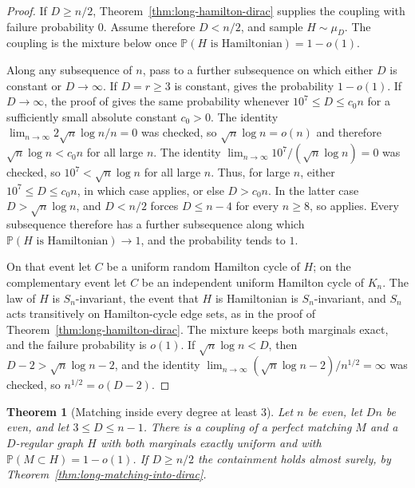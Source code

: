 \documentclass[11pt]{article}
\newtheorem{theorem}{Theorem}
\newcommand{\PP}{\mathbb{P}}
\begin{document}
\begin{proof}
If \(D\ge n/2\), Theorem~\ref{thm:long-hamilton-dirac} supplies the coupling with
failure probability \(0\). Assume therefore \(D<n/2\), and sample \(H\sim\mu_D\).
The coupling is the mixture below once \(\PP(H\text{ is Hamiltonian})=1-o(1)\).

Along any subsequence of \(n\), pass to a further subsequence on which either \(D\)
is constant or \(D\to\infty\).
If \(D=r\ge 3\) is constant, \cite[Theorem~1]{RW94} gives the probability \(1-o(1)\).
If \(D\to\infty\), the proof of \cite[Theorem~1(b)]{CFR02} gives the same
probability whenever \(10^{7}\le D\le c_0 n\) for a sufficiently small absolute
constant \(c_0>0\).
The identity \(\lim_{n\to\infty}2\sqrt{n}\log n/n=0\) was checked, so
\(\sqrt{n}\log n=o(n)\) and therefore \(\sqrt{n}\log n<c_0 n\) for all large \(n\).
The identity \(\lim_{n\to\infty}10^{7}/(\sqrt{n}\log n)=0\) was checked, so
\(10^{7}<\sqrt{n}\log n\) for all large \(n\).
Thus, for large \(n\), either \(10^{7}\le D\le c_0 n\), in which case
\cite[Theorem~1(b)]{CFR02} applies, or else \(D>c_0 n\).
In the latter case \(D>\sqrt{n}\log n\), and \(D<n/2\) forces \(D\le n-4\) for every
\(n\ge 8\), so \cite[Theorem~2.4]{KSVW01} applies.
Every subsequence therefore has a further subsequence along which
\(\PP(H\text{ is Hamiltonian})\to 1\), and the probability tends to \(1\).

On that event let \(C\) be a uniform random Hamilton cycle of \(H\); on the
complementary event let \(C\) be an independent uniform Hamilton cycle of \(K_n\).
The law of \(H\) is \(S_n\)-invariant, the event that \(H\) is Hamiltonian is
\(S_n\)-invariant, and \(S_n\) acts transitively on Hamilton-cycle edge sets, as in
the proof of Theorem~\ref{thm:long-hamilton-dirac}.
The mixture keeps both marginals exact, and the failure probability is \(o(1)\).
If \(\sqrt{n}\log n<D\), then \(D-2>\sqrt{n}\log n-2\), and the identity
\(\lim_{n\to\infty}(\sqrt{n}\log n-2)/n^{1/2}=\infty\) was checked, so
\(n^{1/2}=o(D-2)\).
\end{proof}

\begin{theorem}[Matching inside every degree at least \(3\)]
\label{thm:long-matching-at-least-three}
Let \(n\) be even, let \(Dn\) be even, and let \(3\le D\le n-1\). There is a
coupling of a perfect matching \(M\) and a \(D\)-regular graph \(H\) with both
marginals exactly uniform and with \(\PP(M\subset H)=1-o(1)\). If \(D\ge n/2\)
the containment holds almost surely, by Theorem~\ref{thm:long-matching-into-dirac}.
\end{theorem}
\end{document}
